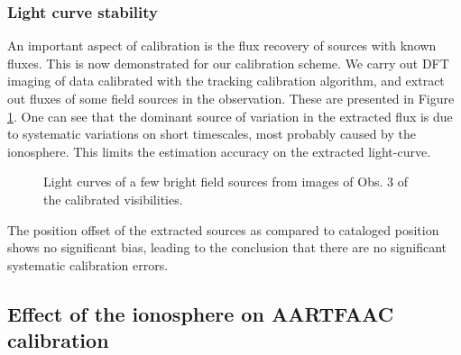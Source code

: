 \documentclass{aa}
\begin{document}
\subsubsection{Light curve stability}

An important  aspect of calibration is  the flux recovery of  sources with known
fluxes. This is  now demonstrated for our calibration scheme.   We carry out DFT
imaging of data calibrated with  the tracking calibration algorithm, and extract
out fluxes  of some field  sources in the  observation.  These are  presented in
Figure  \ref{fig:Light-curves-of}.  One  can  see that  the  dominant source  of
variation  in  the extracted  flux  is due  to  systematic  variations on  short
timescales, most probably caused by  the ionosphere.  This limits the estimation
accuracy on the extracted light-curve.

\begin{figure}[tbh]

\caption{\label{fig:Light-curves-of}Light curves of a few bright
field sources from images of Obs. 3 of the calibrated visibilities.}
\end{figure}
The position offset  of the extracted sources as  compared to cataloged position
shows  no  significant  bias,  leading  to  the conclusion  that  there  are  no
significant systematic calibration errors.


\subsection{\label{sub:iono-effect-on-calib}Effect of the ionosphere on AARTFAAC
calibration}
\end{document}
